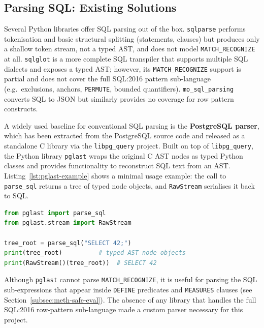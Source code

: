 \subsection{Parsing SQL: Existing Solutions}
\label{subsec:meth-existing-parsers}

Several Python libraries offer SQL parsing out of the box.
\texttt{sqlparse} performs tokenisation and basic structural
splitting (statements, clauses) but produces only a shallow token
stream, not a typed AST, and does not model \texttt{MATCH\_RECOGNIZE}
at all.  \texttt{sqlglot} is a more complete SQL transpiler that
supports multiple SQL dialects and exposes a typed AST; however,
its \texttt{MATCH\_RECOGNIZE} support is partial and does not cover
the full SQL:2016 pattern sub-language (e.g.\ exclusions, anchors,
\texttt{PERMUTE}, bounded quantifiers).  \texttt{mo\_sql\_parsing}
converts SQL to JSON but similarly provides no coverage for row
pattern constructs.

A widely used baseline for conventional SQL parsing is the
\textbf{PostgreSQL parser}, which has been extracted from the
PostgreSQL source code and released as a standalone C library via
the \texttt{libpg\_query} project.  Built on top of
\texttt{libpg\_query}, the Python library \texttt{pglast} wraps the
original C AST nodes as typed Python classes and provides
functionality to reconstruct SQL text from an AST.
Listing~\ref{lst:pglast-example} shows a minimal usage example:
the call to \texttt{parse\_sql} returns a tree of typed node
objects, and \texttt{RawStream} serialises it back to SQL.

\begin{lstlisting}[language=Python,
    caption={Parsing a SQL statement with \texttt{pglast} and
             reconstructing SQL text},
    label={lst:pglast-example}]
from pglast import parse_sql
from pglast.stream import RawStream

tree_root = parse_sql("SELECT 42;")
print(tree_root)          # typed AST node objects
print(RawStream()(tree_root))  # SELECT 42
\end{lstlisting}

Although \texttt{pglast} cannot parse \texttt{MATCH\_RECOGNIZE}, it
is useful for parsing the SQL sub-expressions that appear inside
\texttt{DEFINE} predicates and \texttt{MEASURES} clauses
(see Section~\ref{subsec:meth-safe-eval}).  The absence of any
library that handles the full SQL:2016 row-pattern sub-language
made a custom parser necessary for this project.

